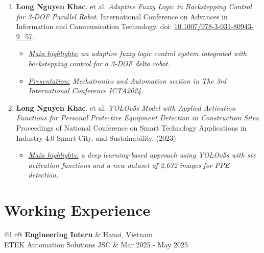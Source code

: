 \documentclass[a4paper,11pt]{article}
\begin{document}
\begin{enumerate}
\item \textbf{Long Nguyen Khac}. et al. \textit{Adaptive Fuzzy Logic in Backstepping Control for 3-DOF Parallel Robot}. International Conference on Advances in Information and Communication Technology, doi: \href{https://doi.org/10.1007/978-3-031-80943-9_57}{10.1007/978-3-031-80943-9\_57}.
\begin{itemize}[nosep]
\item \textit{\underline{Main highlights:} an adaptive fuzzy logic control system integrated with backstepping control for a 3-DOF delta robot.}
\item \textit{\underline{Presentation:} Mechatronics and Automation section in The 3rd International Conference ICTA2024.}
\end{itemize}
\item \textbf{Long Nguyen Khac}. et al. \textit{YOLOv5s Model with Applied Activation Functions for Personal Protective Equipment Detection in Construction Sites}. Proceedings of National Conference on Smart Technology Applications in Industry 4.0 Smart City, and Sustainability. (2023)
\begin{itemize}[nosep]
\item \textit{\underline{Main highlights:} a deep learning-based approach using YOLOv5s with six activation functions and a new dataset of 2,632 images for PPE detection.}
\end{itemize}
\end{enumerate}

\section{Working Experience}

\begin{tabularx}{\linewidth}{@{}l r@{}}
\textbf{Engineering Intern} & \hfill Hanoi, Vietnam \\[3pt]
ETEK Automation Solutions JSC & \hfill Mar 2025 - May 2025 \\[3pt]
\end{tabularx}
\end{document}
